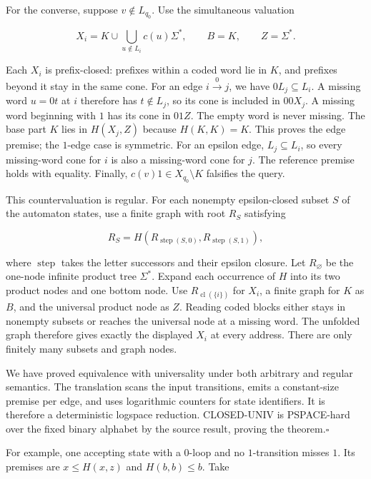 \documentclass[
  11pt,
  a4paper,
]{article}
\newcounter{none} %
\begin{document}
For the converse, suppose \(v\notin L_{q_0}\). Use the simultaneous
valuation

\[X_i=K\cup\bigcup_{u\notin L_i}c(u)\Sigma^*,
\qquad B=K,\qquad Z=\Sigma^*.\]

Each \(X_i\) is prefix-closed: prefixes within a coded word lie in
\(K\), and prefixes beyond it stay in the same cone. For an edge
\(i\xrightarrow{0}j\), we have \(0L_j\subseteq L_i\). A missing word
\(u=0t\) at \(i\) therefore has \(t\notin L_j\), so its cone is included
in \(00X_j\). A missing word beginning with \(1\) has its cone in
\(01Z\). The empty word is never missing. The base part \(K\) lies in
\(H(X_j,Z)\) because \(H(K,K)=K\). This proves the edge premise; the
\(1\)-edge case is symmetric. For an epsilon edge, \(L_j\subseteq L_i\),
so every missing-word cone for \(i\) is also a missing-word cone for
\(j\). The reference premise holds with equality. Finally,
\(c(v)1\in X_{q_0}\setminus K\) falsifies the query.

This countervaluation is regular. For each nonempty epsilon-closed
subset \(S\) of the automaton states, use a finite graph with root
\(R_S\) satisfying

\[R_S=H(R_{\operatorname{step}(S,0)},
        R_{\operatorname{step}(S,1)}),\]

where \(\operatorname{step}\) takes the letter successors and their
epsilon closure. Let \(R_\varnothing\) be the one-node infinite product
tree \(\Sigma^*\). Expand each occurrence of \(H\) into its two product
nodes and one bottom node. Use \(R_{\operatorname{cl}(\{i\})}\) for
\(X_i\), a finite graph for \(K\) as \(B\), and the universal product
node as \(Z\). Reading coded blocks either stays in nonempty subsets or
reaches the universal node at a missing word. The unfolded graph
therefore gives exactly the displayed \(X_i\) at every address. There
are only finitely many subsets and graph nodes.

We have proved equivalence with universality under both arbitrary and
regular semantics. The translation scans the input transitions, emits a
constant-size premise per edge, and uses logarithmic counters for state
identifiers. It is therefore a deterministic logspace reduction.
CLOSED-UNIV is PSPACE-hard over the fixed binary alphabet by the source
result, proving the theorem.\nobreak\hspace{.5em}\(\square\)

For example, one accepting state with a \(0\)-loop and no
\(1\)-transition misses \(1\). Its premises are \(x\le H(x,z)\) and
\(H(b,b)\le b\). Take
\end{document}
